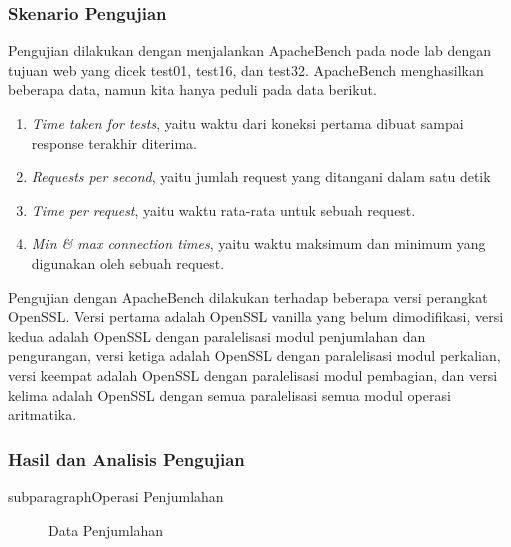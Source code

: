     \subsubsection{Skenario Pengujian}
      Pengujian dilakukan dengan menjalankan ApacheBench pada node lab dengan tujuan web yang dicek test01, test16, dan test32. ApacheBench menghasilkan beberapa data, namun kita hanya peduli pada data berikut.
      \begin{enumerate}[label=\roman*.]
        \item \textit{Time taken for tests}, yaitu waktu dari koneksi pertama dibuat sampai response terakhir diterima.
        \item \textit{Requests per second}, yaitu jumlah request yang ditangani dalam satu detik
        \item \textit{Time per request}, yaitu waktu rata-rata untuk sebuah request.
        \item \textit{Min \& max connection times}, yaitu waktu maksimum dan minimum yang digunakan oleh sebuah request.
      \end{enumerate}

      Pengujian dengan ApacheBench dilakukan terhadap beberapa versi perangkat OpenSSL. Versi pertama adalah OpenSSL vanilla yang belum dimodifikasi, versi kedua adalah OpenSSL dengan paralelisasi modul penjumlahan dan pengurangan, versi ketiga adalah OpenSSL dengan paralelisasi modul perkalian, versi keempat adalah OpenSSL dengan paralelisasi modul pembagian, dan versi kelima adalah OpenSSL dengan semua paralelisasi semua modul operasi aritmatika.

    \subsubsection{Hasil dan Analisis Pengujian}

      subparagraph{Operasi Penjumlahan}
      \begin{figure}
        \centering
        \caption{Data Penjumlahan}
        \label{fig:add_data}
      \end{figure}

